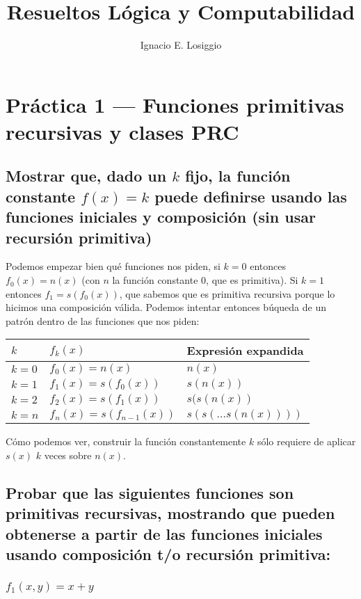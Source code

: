 \documentclass[fleqn, 11pt]{article}
\title{Resueltos Lógica y Computabilidad}
\author{Ignacio E. Losiggio}
\begin{document}
\maketitle

\section{Práctica 1 --- Funciones primitivas recursivas y clases PRC}

\subsection{Mostrar que, dado un $k$ fijo, la función constante $f(x) = k$
puede definirse usando las funciones iniciales y composición (sin usar
recursión primitiva)}

Podemos empezar bien qué funciones nos piden, si $k = 0$  entonces
$f_0(x) = n(x)$ (con $n$ la función constante $0$, que es primitiva). Si
$k = 1$ entonces $f_1 = s(f_0(x))$, que sabemos que es primitiva recursiva
porque lo hicimos una composición válida. Podemos intentar entonces
búqueda de un patrón dentro de las funciones que nos piden:
\begin{center}
	\begin{tabular}{lll}
		$k$     & $f_k(x)$ & Expresión expandida \\ \toprule
		$k = 0$ & $f_0(x) = n(x)$          & $n(x)$ \\
		$k = 1$ & $f_1(x) = s(f_0(x))$     & $s(n(x))$ \\
		$k = 2$ & $f_2(x) = s(f_1(x))$     & $s(s(n(x))$ \\
		$k = n$ & $f_n(x) = s(f_{n-1}(x))$ & $s(s(\dots s(n(x))))$ \\
	\end{tabular}
\end{center}

Cómo podemos ver, construir la función constantemente $k$ sólo requiere de
aplicar $s(x)$ $k$ veces sobre $n(x)$.

\subsection{Probar que las siguientes funciones son primitivas recursivas,
mostrando que pueden obtenerse a partir de las funciones iniciales usando
composición t/o recursión primitiva:}

\subsubsection{$f_1(x, y) = x + y$}
\end{document}
